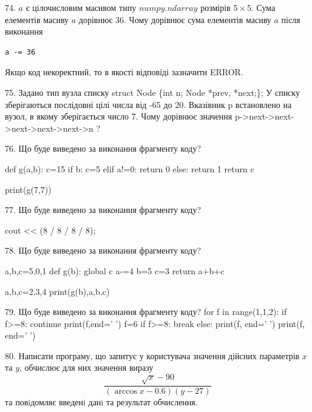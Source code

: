 \documentclass[11pt]{article}
\begin{document}
\vspace{5mm}

74. 
$a$ є цілочисловим масивом типу $numpy.ndarray$ розмірів $5{\times}5$. Сума елементів масиву $a$ дорівнює 36. Чому дорівнює сума елементів масиву $a$ після виконання 
\begin{verbatim}
a -= 36
\end{verbatim}


Якщо код некоректний, то в якості відповіді зазначити ERROR.


\vspace{5mm}

75. 
Задано тип вузла списку
struct Node \{int n; Node *prev, *next;\};
У списку зберігаються послідовні цілі числа від -65 до 20. Вказівник p встановлено на вузол, в якому зберігається число 7.
Чому дорівнює значення p->next->next->next->next->next->n ?\vspace{5mm}

76. Що буде виведено за виконання фрагменту коду?

def g(a,b):
    c=15
    if b:
        c=5
    elif a!=0:
         return 0
    else: 
        return 1
    return c

print(g(7,7))\vspace{5mm}

77. Що буде виведено за виконання фрагменту коду?

cout << (8 / 8 / 8 / 8);
\vspace{5mm}

78. Що буде виведено за виконання фрагменту коду?

a,b,c=5,0,1
def g(b):
global c    a-=4
    b=5
    c=3
    return a+b+c

a,b,c=2,3,4
print(g(b),a,b,c)
\vspace{5mm}

79. Що буде виведено за виконання фрагменту коду?
for f in range(1,1,2):
    if f>=8:
        continue
        print(f,end=' ')
        f=6
    if f>=8:
        break
else:
    print(f, end=' ')
print(f, end=' ')
\vspace{5mm}

80. 
Написати програму, що запитує у користувача значення дійсних параметрів $x$ та $y$, обчислює для них значення виразу 
$$\frac{\sqrt x - 90}{(\arccos x - 0.6) (y - 27)}$$ 
та повiдомляє введенi данi та результат обчислення.
\end{document}
